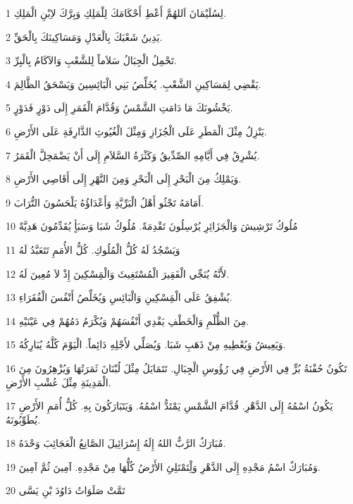 \par 1 لِسُلَيْمَانَ اَللهُمَّ أَعْطِ أَحْكَامَكَ لِلْمَلِكِ وَبِرَّكَ لاِبْنِ الْمَلِكِ.
\par 2 يَدِينُ شَعْبَكَ بِالْعَدْلِ وَمَسَاكِينَكَ بِالْحَقِّ.
\par 3 تَحْمِلُ الْجِبَالُ سَلاَماً لِلشَّعْبِ وَالآكَامُ بِالْبِرِّ.
\par 4 يَقْضِي لِمَسَاكِينِ الشَّعْبِ. يُخَلِّصُ بَنِي الْبَائِسِينَ وَيَسْحَقُ الظَّالِمَ.
\par 5 يَخْشُونَكَ مَا دَامَتِ الشَّمْسُ وَقُدَّامَ الْقَمَرِ إِلَى دَوْرٍ فَدَوْرٍ.
\par 6 يَنْزِلُ مِثْلَ الْمَطَرِ عَلَى الْجُزَازِ وَمِثْلَ الْغُيُوثِ الذَّارِفَةِ عَلَى الأَرْضِ.
\par 7 يُشْرِقُ فِي أَيَّامِهِ الصِّدِّيقُ وَكَثْرَةُ السَّلاَمِ إِلَى أَنْ يَضْمَحِلَّ الْقَمَرُ.
\par 8 وَيَمْلِكُ مِنَ الْبَحْرِ إِلَى الْبَحْرِ وَمِنَ النَّهْرِ إِلَى أَقَاصِي الأَرْضِ.
\par 9 أَمَامَهُ تَجْثُو أَهْلُ الْبَرِّيَّةِ وَأَعْدَاؤُهُ يَلْحَسُونَ التُّرَابَ.
\par 10 مُلُوكُ تَرْشِيشَ وَالْجَزَائِرِ يُرْسِلُونَ تَقْدِمَةً. مُلُوكُ شَبَا وَسَبَأٍ يُقَدِّمُونَ هَدِيَّةً
\par 11 وَيَسْجُدُ لَهُ كُلُّ الْمُلُوكِ. كُلُّ الأُمَمِ تَتَعَبَّدُ لَهُ
\par 12 لأَنَّهُ يُنَجِّي الْفَقِيرَ الْمُسْتَغِيثَ وَالْمَِسْكِينَ إِذْ لاَ مُعِينَ لَهُ.
\par 13 يُشْفِقُ عَلَى الْمَِسْكِينِ وَالْبَائِسِ وَيُخَلِّصُ أَنْفُسَ الْفُقَرَاءِ.
\par 14 مِنَ الظُّلْمِ وَالْخَطْفِ يَفْدِي أَنْفُسَهُمْ وَيُكْرَمُ دَمُهُمْ فِي عَيْنَيْهِ.
\par 15 وَيَعِيشُ وَيُعْطِيهِ مِنْ ذَهَبِ شَبَا. وَيُصَلِّي لأَجْلِهِ دَائِماً. الْيَوْمَ كُلَّهُ يُبَارِكُهُ.
\par 16 تَكُونُ حُفْنَةُ بُرٍّ فِي الأَرْضِ فِي رُؤُوسِ الْجِبَالِ. تَتَمَايَلُ مِثْلَ لُبْنَانَ ثَمَرَتُهَا وَيُزْهِرُونَ مِنَ الْمَدِينَةِ مِثْلَ عُشْبِ الأَرْضِ.
\par 17 يَكُونُ اسْمُهُ إِلَى الدَّهْرِ. قُدَّامَ الشَّمْسِ يَمْتَدُّ اسْمُهُ. وَيَتَبَارَكُونَ بِهِ. كُلُّ أُمَمِ الأَرْضِ يُطَوِّبُونَهُ.
\par 18 مُبَارَكٌ الرَّبُّ اللهُ إِلَهُ إِسْرَائِيلَ الصَّانِعُ الْعَجَائِبَ وَحْدَهُ.
\par 19 وَمُبَارَكٌ اسْمُ مَجْدِهِ إِلَى الدَّهْرِ وَلِْتَمْتَلِئِ الأَرْضُ كُلُّهَا مِنْ مَجْدِهِ. آمِينَ ثُمَّ آمِينَ.
\par 20 تَمَّتْ صَلَوَاتُ دَاوُدَ بْنِ يَسَّى

